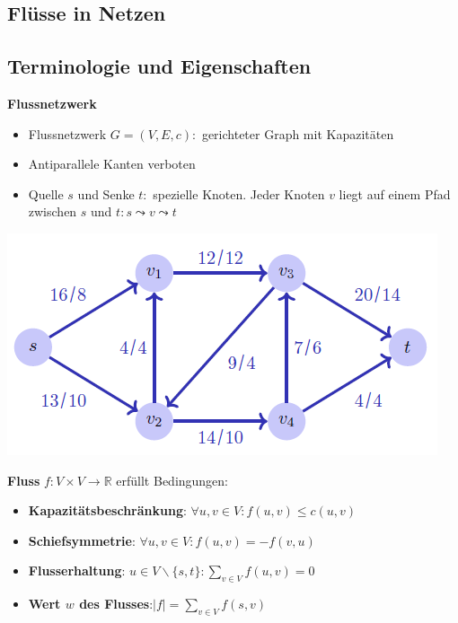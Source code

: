 \vspace{-4pt}
\begin{sectionbox}
\section{Flüsse in Netzen}
\subsection{Terminologie und Eigenschaften}\medskip
\textbf{Flussnetzwerk}\par
\begin{itemize}
    \item Flussnetzwerk $G=(V, E, c):$ gerichteter Graph mit Kapazitäten
    \item Antiparallele Kanten verboten
    \item Quelle $s$ und Senke $t:$ spezielle Knoten. Jeder Knoten $v$ liegt auf einem Pfad zwischen $s$ und $t: s \leadsto v \leadsto t$
\end{itemize}\par\smallskip
\begin{center}
    \includegraphics[width = 0.9\columnwidth]{../img/flussNet.png}
\end{center}

\textbf{Fluss}  $f: V \times V \rightarrow \mathbb{R}$ erfüllt Bedingungen:\par
\begin{itemize}
    \item \textbf{Kapazitätsbeschränkung}: $\forall u, v \in V: f(u, v) \leq c(u, v)$
    \item \textbf{Schiefsymmetrie}: $\forall u, v \in V: f(u, v)=-f(v, u)$
    \item \textbf{Flusserhaltung}: $u \in V \backslash\{s, t\}: \sum_{v \in V} f(u, v)=0$
    \item \textbf{Wert $w$ des Flusses}:$|f|=\sum_{v \in V} f(s, v)$
\end{itemize}\par\smallskip
\end{sectionbox}
